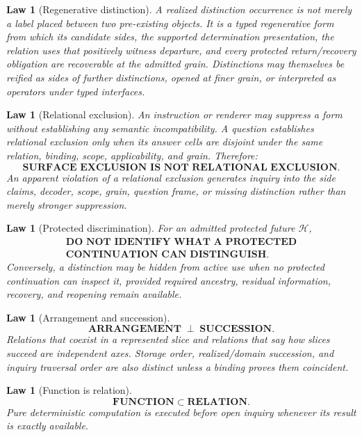 \documentclass[11pt,oneside]{article}
\newtheorem{law}[definition]{Law}
\begin{document}
\begin{law}[Regenerative distinction]
A realized distinction occurrence is not merely a label placed between two pre-existing objects.  It is a typed regenerative form from which its candidate sides, the supported determination presentation, the relation uses that positively witness departure, and every protected return/recovery obligation are recoverable at the admitted grain.  Distinctions may themselves be reified as sides of further distinctions, opened at finer grain, or interpreted as operators under typed interfaces.
\end{law}

\begin{law}[Relational exclusion]
An instruction or renderer may suppress a form without establishing any semantic incompatibility.  A question establishes relational exclusion only when its answer cells are disjoint under the same relation, binding, scope, applicability, and grain.  Therefore:
\[
\boxed{\textbf{SURFACE EXCLUSION IS NOT RELATIONAL EXCLUSION.}}
\]
An apparent violation of a relational exclusion generates inquiry into the side claims, decoder, scope, grain, question frame, or missing distinction rather than merely stronger suppression.
\end{law}

\begin{law}[Protected discrimination]
For an admitted protected future \(\mathcal H\),
\[
\boxed{
\begin{gathered}
\textbf{DO NOT IDENTIFY WHAT A PROTECTED}\\
\textbf{CONTINUATION CAN DISTINGUISH.}
\end{gathered}
}
\]
Conversely, a distinction may be hidden from active use when no protected continuation can inspect it, provided required ancestry, residual information, recovery, and reopening remain available.
\end{law}

\begin{law}[Arrangement and succession]
\[
\boxed{\textbf{ARRANGEMENT}\;\perp\;\textbf{SUCCESSION}.}
\]
Relations that coexist in a represented slice and relations that say how slices succeed are independent axes.  Storage order, realized/domain succession, and inquiry traversal order are also distinct unless a binding proves them coincident.
\end{law}

\begin{law}[Function is relation]
\[
\boxed{\textbf{FUNCTION}\subset\textbf{RELATION}.}
\]
Pure deterministic computation is executed before open inquiry whenever its result is exactly available.
\end{law}
\end{document}
